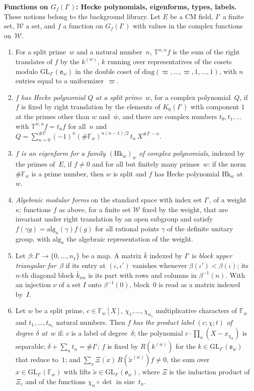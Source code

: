 \documentclass[11pt,a4paper]{article}
\newcommand{\F}{\mathbb{F}}
\newcommand{\m}[1]{\mbox{$#1$}}        %
\newcommand{\subhead}[1]{\par\addvspace{9pt plus 2pt}\Needspace{4\baselineskip}\noindent\textbf{#1}\enspace\ignorespaces}
\theoremstyle{plainx}
\theoremstyle{uprightx}
\newcommand{\GL}{\mathrm{GL}}
\begin{document}
\subhead{Functions on $G_f(I')$: Hecke polynomials, eigenforms, types, labels.} These notions belong to the
background library. Let $E$ be a CM field, $I'$ a finite set, $\mathcal W$ a set, and $f$ a function on $G_f(I')$
with values in the complex functions on~$\mathcal W$.
\begin{enumerate}[label=\textup{(\alph*)},leftmargin=2.3em,itemsep=2pt]
\item For a split prime~$w$ and a natural number~$n$, \m{\mathbb T^{w,n}f} is the sum of the right translates of
$f$ by the \m{k^{(w)}}, $k$ running over representatives of the cosets modulo \m{\GL_{I'}(\mathfrak{o}_w)} in the double coset
of \m{\mathrm{diag}(\varpi,\dots,\varpi,1,\dots,1)}, with $n$ entries equal to a uniformizer~$\varpi$.
\item $f$ \emph{has Hecke polynomial $Q$ at a split prime~$w$}, for a complex polynomial~$Q$, if $f$ is fixed by
right translation by the elements of $K_0(I')$ with component $1$ at the primes other than $w$ and~$\bar w$, and
there are complex numbers \m{t_0,t_1,\dots} with \m{\mathbb T^{w,n}f=t_nf} for all~$n$ and
\m{Q=\sum_{n=0}^{\#I'}(-1)^n(\#\F_w)^{n(n-1)/2}\,t_n\,X^{\#I'-n}}.
\item $f$ \emph{is an eigenform for a family \m{(\mathrm{Hk}_w)_w} of complex polynomials}, indexed by the primes
of~$E$, if \m{f\ne0} and for all but finitely many primes~$w$: if the norm $\#\F_w$ is a prime number, then $w$ is
split and $f$ has Hecke polynomial $\mathrm{Hk}_w$ at~$w$.
\item \emph{Algebraic modular forms} on the standard space with index set $I'$, of a weight~$\kappa$: functions
$f$ as above, for a finite set $\mathcal W$ fixed by the weight, that are invariant under right translation by an
open subgroup and satisfy \m{f(\gamma g)=\mathrm{alg}_\kappa(\gamma)f(g)} for all rational points $\gamma$ of the
definite unitary group, with $\mathrm{alg}_\kappa$ the algebraic representation of the weight.
\item Let \m{\beta\colon I'\to\{0,\dots,n_1\}} be a map. A matrix $\bar k$ indexed by $I'$ is \emph{block upper
triangular for~$\beta$} if its entry at \m{(\iota,\iota')} vanishes whenever \m{\beta(\iota')<\beta(\iota)}; its
$n$-th diagonal block $\bar k_{nn}$ is its part with rows and columns in \m{\beta^{-1}(n)}. With an injection
$\nu$ of a set $I$ onto \m{\beta^{-1}(0)}, block~$0$ is read as a matrix indexed by~$I$.
\item Let $w$ be a split prime, \m{c\in\F_w[X]}, \m{\chi_1,\dots,\chi_{n_1}} multiplicative characters of $\F_w$ and
\m{t_1,\dots,t_{n_1}} natural numbers. Then $f$ \emph{has the product label \m{(c;\chi;t)} of degree $\delta$
at~$w$} if: $c$ is a label of degree~$\delta$; the polynomial \m{c\cdot\prod_n(X-x_{\chi_n})} is separable;
\m{\delta+\sum_nt_n=\#I'}; $f$ is fixed by \m{R(k^{(w)})} for the \m{k\in\GL_{I'}(\mathfrak{o}_w)} that reduce to~$1$; and
\m{\sum_{x}\overline{\Xi(x)}\,R(\tilde x^{(w)})f\ne0}, the sum over \m{x\in\GL_{I'}(\F_w)} with lifts
\m{\tilde x\in\GL_{I'}(\mathfrak{o}_w)}, where $\Xi$ is the induction product of $\Xi_c$ and of the functions
\m{\chi_n\circ\det} in size~$t_n$.
\end{enumerate}
\end{document}
